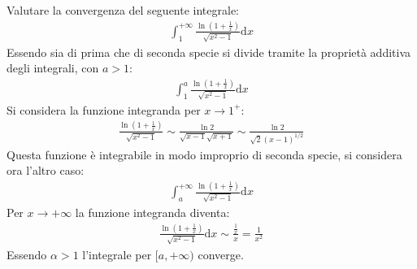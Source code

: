 \documentclass{article}
\newcommand{\df}{\mathrm{d}}
\numberwithin{equation}{subsection}
\begin{document}
Valutare la convergenza del seguente integrale:
\begin{gather*}
    \displaystyle\int_1^{+\infty}\frac{\ln\left(1+\frac{1}{x}\right)}{\sqrt{x^2-1}}\df x
\end{gather*}
Essendo sia di prima che di seconda specie si divide tramite la proprietà additiva degli integrali, con $a>1$:
\begin{gather*}
    \displaystyle\int_1^a\frac{\ln\left(1+\frac{1}{x}\right)}{\sqrt{x^2-1}}\df x
\end{gather*}
Si considera la funzione integranda per $x\to1^+$:
\begin{gather*}
    \displaystyle\frac{\ln\left(1+\frac{1}{x}\right)}{\sqrt{x^2-1}}\sim\frac{\ln2}{\sqrt{x-1}\sqrt{x+1}}\sim\frac{\ln2}{\sqrt2(x-1)^{1/2}}
\end{gather*}
Questa funzione è integrabile in modo improprio di seconda specie, si considera ora l'altro caso:
\begin{gather*}
    \displaystyle\int_a^{+\infty}\frac{\ln\left(1+\frac{1}{x}\right)}{\sqrt{x^2-1}}\df x
\end{gather*}
Per $x\to+\infty$ la funzione integranda diventa:
\begin{gather*}
    \frac{\ln\left(1+\frac{1}{x}\right)}{\sqrt{x^2-1}}\df x\sim\frac{\frac{1}{x}}{x}=\frac{1}{x^2}
\end{gather*}
Essendo $\alpha>1$ l'integrale per $[a,+\infty)$ converge. 
\end{document}
